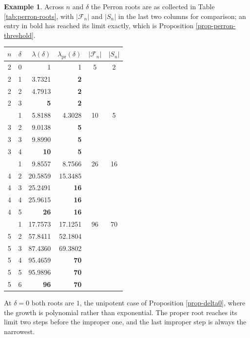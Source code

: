 \documentclass[11pt, a4paper, abstract=yes]{scrartcl}
\theoremstyle{definition}
\newtheorem{mexample}[definition]{Example}
\theoremstyle{remark}
\theoremstyle{plain}
\begin{document}
\begin{mexample}
Across \(n\) and \(\delta\) the Perron roots are as collected in Table \ref{tab:perron-roots},
with \(\lvert\mathcal F_n\rvert\) and \(\lvert S_n\rvert\) in the last two columns for
comparison; an entry in bold has reached its limit exactly, which is
Proposition \ref{prop-perron-threshold}.
\begingroup\small
\begin{center}
\begin{tabular}{@{}cc rr cc@{}}
  \toprule
  \(n\) & \(\delta\) & \(\lambda(\delta)\) & \(\lambda_{\mathrm{pr}}(\delta)\)
        & \(\lvert\mathcal F_n\rvert\) & \(\lvert S_n\rvert\)\\
  \midrule
  2 & 0 & 1 & 1 & 5 & 2\\
  2 & 1 & 3.7321 & \textbf{2} & &\\
  2 & 2 & 4.7913 & \textbf{2} & &\\
  2 & 3 & \textbf{5} & \textbf{2} & &\\
  \addlinespace
  3 & 1 & 5.8188 & 4.3028 & 10 & 5\\
  3 & 2 & 9.0138 & \textbf{5} & &\\
  3 & 3 & 9.8990 & \textbf{5} & &\\
  3 & 4 & \textbf{10} & \textbf{5} & &\\
  \addlinespace
  4 & 1 & 9.8557 & 8.7566 & 26 & 16\\
  4 & 2 & 20.5859 & 15.3485 & &\\
  4 & 3 & 25.2491 & \textbf{16} & &\\
  4 & 4 & 25.9615 & \textbf{16} & &\\
  4 & 5 & \textbf{26} & \textbf{16} & &\\
  \addlinespace
  5 & 1 & 17.7573 & 17.1251 & 96 & 70\\
  5 & 2 & 57.8411 & 52.1804 & &\\
  5 & 3 & 87.4360 & 69.3802 & &\\
  5 & 4 & 95.4659 & \textbf{70} & &\\
  5 & 5 & 95.9896 & \textbf{70} & &\\
  5 & 6 & \textbf{96} & \textbf{70} & &\\
  \bottomrule
\end{tabular}
\label{tab:perron-roots}
\end{center}
\endgroup
At \(\delta=0\) both roots are \(1\), the unipotent case of Proposition \ref{prop-delta0}, where the
growth is polynomial rather than exponential. The proper root reaches its limit two steps before the
improper one, and the last improper step is always the narrowest.
\label{mex-recurrences}
\end{mexample}
\end{document}
